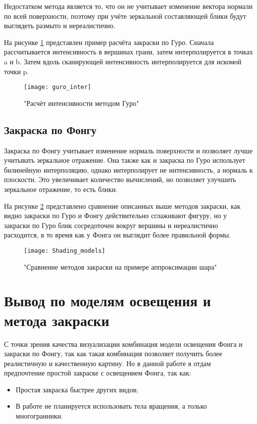 Недостатком метода является то, что он не учитывает изменение вектора нормали по всей поверхности, поэтому при учёте зеркальной составляющей блики будут выглядеть размыто и нереалистично.

На рисунке \ref{fig:guro_inter} представлен пример расчёта закраски по Гуро. Сначала рассчитывается интенсивность в вершинах грани, затем интерполируется в точках a и b. Затем вдоль сканирующей  интенсивность интерполируется для искомой точки p.

\begin{figure}[h]
	\centering
	\texttt{[image: guro\_inter]}
	\caption{"Расчёт интенсивности методом Гуро"}
	\label{fig:guro_inter}
\end{figure}

\subsection{Закраска по Фонгу}
Закраска по Фонгу учитывает изменение нормаль поверхности и позволяет лучше учитывать зеркальное отражение. Она также как и закраска по Гуро использует билинейную интерполяцию, однако интерполирует не интенсивность, а нормаль к плоскости. Это увеличивает количество вычислений, но позволяет улучшить зеркальное отражение, то есть блики.

На рисунке \ref{fig:shading} представлено сравнение описанных выше методов закраски, как видно закраски по Гуро и Фонгу действительно сглаживают фигуру, но у закраски по Гуро блик сосредоточен вокруг вершины и нереалистично расходится, в то время как у Фонга он выглядит более правильной формы.

\begin{figure}[h]
	\centering
	\texttt{[image: Shading\_models]}
	\caption{"Сравнение методов закраски на примере аппроксимации шара"}
	\label{fig:shading}
\end{figure}

\section{Вывод по моделям освещения и метода закраски}

С точки зрения качества визуализации комбинация модели освещения Фонга и закраски по Фонгу, так как такая комбинация позволяет получить более реалистичную и качественную картину. Но в данной работе я отдам предпочтение простой закраске с освещением Фонга, так как:
\begin{itemize}
	\item Простая закраска быстрее других видов;
	\item В работе не планируется использовать тела вращения, а только многогранники.
\end{itemize}




